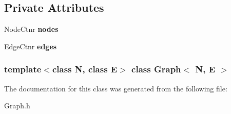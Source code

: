 \subsection*{\-Private \-Attributes}
\begin{DoxyCompactItemize}
\item 
\hypertarget{classGraph_ae5b07a29eb25d577ebfbc30e63cf7846}{\-Node\-Ctnr {\bfseries nodes}}\label{classGraph_ae5b07a29eb25d577ebfbc30e63cf7846}

\item 
\hypertarget{classGraph_ac21185ccb957a59c69454238a9e75eb9}{\-Edge\-Ctnr {\bfseries edges}}\label{classGraph_ac21185ccb957a59c69454238a9e75eb9}

\end{DoxyCompactItemize}
\subsubsection*{template$<$class \-N, class \-E$>$ class Graph$<$ N, E $>$}



\-The documentation for this class was generated from the following file\-:\begin{DoxyCompactItemize}
\item 
\-Graph.\-h\end{DoxyCompactItemize}
